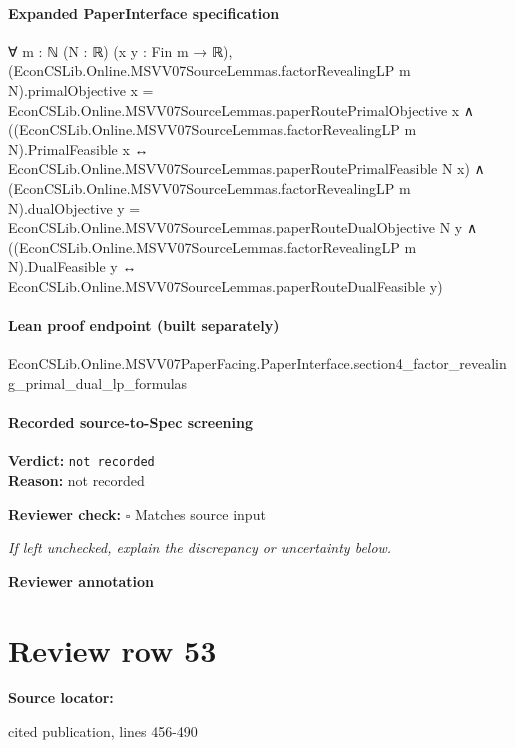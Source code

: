 \documentclass[10pt]{article}
\newcommand{\reviewerbox}{%
  \par\noindent\fbox{\parbox{0.96\linewidth}{\rule{0pt}{0.38in}}}\par
}
\newcommand{\reviewmatch}[1]{%
  \par\noindent\textbf{Reviewer check:} $\square$\; #1\par
  \noindent\emph{If left unchecked, explain the discrepancy or uncertainty below.}\par
}
\begin{document}
\paragraph{Expanded PaperInterface specification}
\begin{ReviewVerbatim}
∀ {m : ℕ} (N : ℝ) (x y : Fin m → ℝ),
  (EconCSLib.Online.MSVV07SourceLemmas.factorRevealingLP m N).primalObjective x =
      EconCSLib.Online.MSVV07SourceLemmas.paperRoutePrimalObjective x ∧
    ((EconCSLib.Online.MSVV07SourceLemmas.factorRevealingLP m N).PrimalFeasible x ↔
        EconCSLib.Online.MSVV07SourceLemmas.paperRoutePrimalFeasible N x) ∧
      (EconCSLib.Online.MSVV07SourceLemmas.factorRevealingLP m N).dualObjective y =
          EconCSLib.Online.MSVV07SourceLemmas.paperRouteDualObjective N y ∧
        ((EconCSLib.Online.MSVV07SourceLemmas.factorRevealingLP m N).DualFeasible y ↔
          EconCSLib.Online.MSVV07SourceLemmas.paperRouteDualFeasible y)
\end{ReviewVerbatim}

\paragraph{Lean proof endpoint (built separately)}\begin{ReviewVerbatim}
EconCSLib.Online.MSVV07PaperFacing.PaperInterface.section4_factor_revealing_primal_dual_lp_formulas
\end{ReviewVerbatim}

\paragraph{Recorded source-to-Spec screening}
\textbf{Verdict:} \texttt{not recorded}
\\
\textbf{Reason:} not recorded
\reviewmatch{Matches source input}
\noindent\textbf{Reviewer annotation}\par
\reviewerbox
\clearpage
\hypertarget{source-claim-ac21de0a185f67c8}{}
\section*{Review row 53}
\textbf{Source locator:} {\footnotesize\raggedright cited publication, lines 456-\allowbreak{}490\par}
\end{document}
